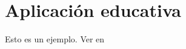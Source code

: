 \chapter{Aplicación educativa}
\label{cap:aplicationEducativa}

Esto es un ejemplo. Ver en  \cite{darwin2009origen} \cite{del1984luces}